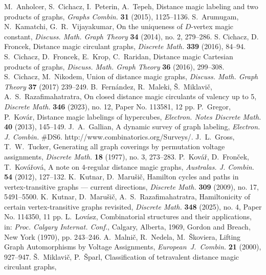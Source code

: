 \documentclass[11 pt,english]{article}
\theoremstyle{definition}
\begin{document}
\begin{thebibliography}{}
 M.~Anholcer, S.~Cichacz, I.~Peterin, A.~Tepeh,
	Distance magic labeling and two products of graphs,
	{\em Graphs Combin.} {\bf 31} (2015), 1125--1136.
 S.~Arumugam, N.~Kamatchi, G.~R.~Vijayakumar, 
	On the uniqueness of $D$-vertex magic constant, 
	{\em Discuss. Math. Graph Theory} {\bf 34} (2014), no. 2, 279--286.
 S. Cichacz, D. Froncek, 
	Distance magic circulant graphs, 
	{\em Discrete Math.} {\bf 339} (2016), 84--94.
 S.~Cichacz, D.~Froncek, E.~Krop, C.~Raridan, 
	Distance magic Cartesian products of graphs,
	{\em Discuss. Math. Graph Theory} {\bf 36} (2016), 299--308.
 S.~Cichacz, M.~Nikodem,
	Union of distance magic graphs,
	{\em Discuss. Math. Graph Theory} {\bf 37} (2017) 239--249.
 B.~Fern\'andez, R.~Maleki, \v S.~Miklavi\v c, A.~S.~Razafimahatratra,
	On closed distance magic circulants of valency up to 5,
	{\em Discrete Math.} {\bf 346} (2023), no. 12, Paper No. 113581, 12 pp.
 P.~Gregor, P.~Kov\'ar, 
	Distance magic labelings of hypercubes,
	{\em Electron. Notes Discrete Math.} {\bf 40} (2013), 145--149.
 J.~A.~Gallian, 
	A dynamic survey of graph labeling, 
	{\em Electron. J. Combin.} \#DS6. http://www.combinatorics.org/Surveys/.
 J.~L.~Gross, T.~W.~Tucker,
	Generating all graph coverings by permutation voltage assignments,
	{\em Discrete Math.} {\bf 18} (1977), no. 3, 273--283.
 P.~Kov\'a\v{r}, D.~Fron\v{c}ek, T.~Kov\'a\v{r}ov\'a, 
	A note on $4$-regular distance magic graphs, 
	{\em Australas. J. Combin.} {\bf 54} (2012), 127--132.
 K.~Kutnar, D.~Maru\v si\v c,
	Hamilton cycles and paths in vertex-transitive graphs --- current directions,
	{\em Discrete Math.} {\bf 309} (2009), no. 17, 5491--5500.
 K.~Kutnar, D.~Maru\v si\v c, A.~S.~Razafimahatratra,
	Hamiltonicity of certain vertex-transitive graphs revisited,
	{\em Discrete Math.} {\bf 348} (2025), no. 4, Paper No. 114350, 11 pp.
 L.~Lov\'asz,
	Combinatorial structures and their applications,
	in: {\em Proc. Calgary Internat. Conf.}, Calgary, Alberta, 1969, Gordon and Breach, New York (1970), pp. 243--246.	
 A.~Malni\v c, R.~Nedela, M.~\v Skoviera,
	Lifting Graph Automorphisms by Voltage Assignments,
      {\em European~J.~Combin.} {\bf 21} (2000), 927--947.
 \v S.~Miklavi\v c, P.~\v Sparl, 
	Classification of tetravalent distance magic circulant graphs, 

\end{thebibliography}
\end{document}
